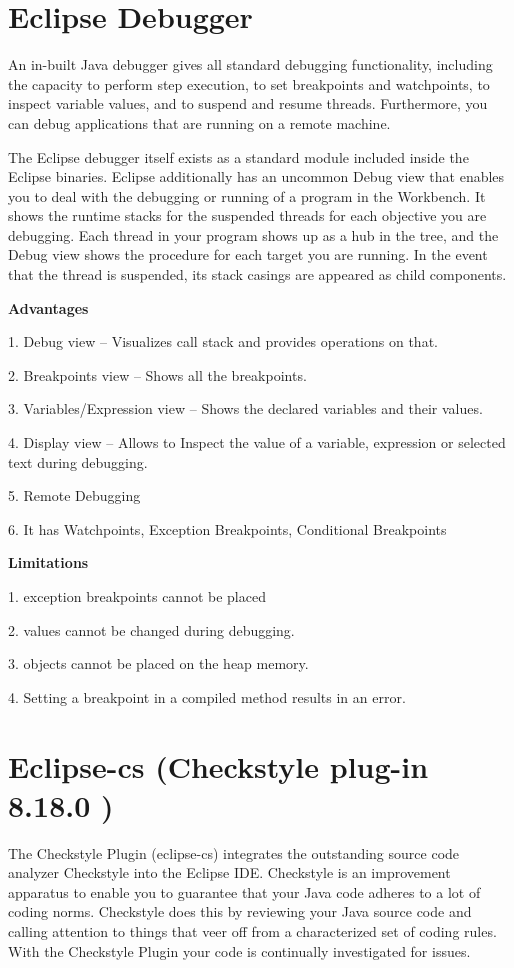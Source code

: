 \documentclass[12pt]{report}
\begin{document}
\section{Eclipse Debugger}
 

An in-built Java debugger gives all standard debugging functionality, including the capacity to perform step execution, to set breakpoints and watchpoints, to inspect variable values, and to suspend and resume threads. Furthermore, you can debug applications that are running on a remote machine.

The Eclipse debugger itself exists as a standard module included inside the Eclipse binaries. Eclipse additionally has an uncommon Debug view that enables you to deal with the debugging or running of a program in the Workbench. It shows the runtime stacks for the suspended threads for each objective you are debugging. Each thread in your program shows up as a hub in the tree, and the Debug view shows the procedure for each target you are running. In the event that the thread is suspended, its stack casings are appeared as child components.

\textbf{Advantages}

1. Debug view – Visualizes call stack and provides operations on that.

2. Breakpoints view – Shows all the breakpoints.

3. Variables/Expression view – Shows the declared variables and their values.

4. Display view – Allows to Inspect the value of a variable, expression or selected text during debugging.

5. Remote Debugging

6. It has Watchpoints, Exception Breakpoints, Conditional Breakpoints

\textbf{Limitations}

1. exception breakpoints cannot be placed

2. values cannot be changed during debugging.

3. objects cannot be placed on the heap memory.

4. Setting a breakpoint in a compiled method results in an error.

 

\newpage
\section{Eclipse-cs (Checkstyle plug-in 8.18.0 )}

 The Checkstyle Plugin (eclipse-cs) integrates the outstanding source code analyzer Checkstyle into the Eclipse IDE. Checkstyle is an improvement apparatus to enable you to guarantee that your Java code adheres to a lot of coding norms. Checkstyle does this by reviewing your Java source code and calling attention to things that veer off from a characterized set of coding rules. With the Checkstyle Plugin your code is continually investigated for issues.
 
\end{document}
